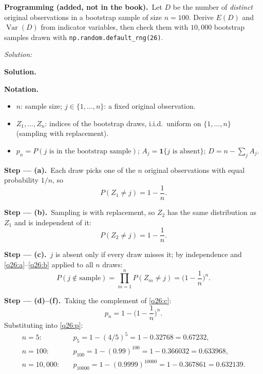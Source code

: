 \documentclass[11pt,a4paper]{article}
\newif\ifsolucoes
\newcommand{\espacoresol}{4.5cm}   %
\numberwithin{equation}{questao}   %
\newcommand{\programacao}{\par\smallskip\noindent\textbf{Programming (added, not in the book).}~}
\newenvironment{notacao}{\par\smallskip\noindent\textbf{Notation.}\begin{itemize}[leftmargin=1.4em,topsep=1pt,itemsep=0pt]\small}{\end{itemize}}
\newcommand{\resolespaco}{\ifsolucoes\else\par\textit{Solution:}\vspace{\espacoresol}\par\fi}
\newcommand{\passo}[2]{\par\smallskip\noindent\textbf{Step --- #1.}~#2}
\newcommand{\solhead}{\par\medskip\noindent{\color{blue!55!black}\rule{\linewidth}{0.3pt}}\par\noindent\textbf{Solution.}}
\newcommand{\Var}{\operatorname{Var}}
\newcommand{\1}{\mathbf{1}}
\begin{document}
\programacao Let $D$ be the number of \emph{distinct} original observations in a bootstrap sample of
size $n=100$. Derive $E(D)$ and $\Var(D)$ from indicator variables, then check them with $10{,}000$
bootstrap samples drawn with \texttt{np.random.default\_rng(26)}.
\resolespaco
\begin{sol}
\solhead
\begin{notacao}
\item $n$: sample size; $j\in\{1,\dots,n\}$: a fixed original observation.
\item $Z_1,\dots,Z_n$: indices of the bootstrap draws, i.i.d.\ uniform on $\{1,\dots,n\}$ (sampling
  with replacement).
\item $p_n=P(j\text{ is in the bootstrap sample})$; $A_j=\1\{j\text{ is absent}\}$; $D=n-\sum_jA_j$.
\end{notacao}

\passo{(a)}{Each draw picks one of the $n$ original observations with equal probability $1/n$, so}
\begin{equation}\label{q26:a}
P(Z_1\neq j)=1-\frac1n .
\end{equation}

\passo{(b)}{Sampling is with replacement, so $Z_2$ has the same distribution as $Z_1$ and is
independent of it:}
\begin{equation}\label{q26:b}
P(Z_2\neq j)=1-\frac1n .
\end{equation}

\passo{(c)}{$j$ is absent only if every draw misses it; by independence and \eqref{q26:a}--\eqref{q26:b}
applied to all $n$ draws:}
\begin{equation}\label{q26:c}
P(j\notin\text{sample})=\prod_{m=1}^nP(Z_m\neq j)=\Big(1-\frac1n\Big)^n .
\end{equation}

\passo{(d)--(f)}{Taking the complement of \eqref{q26:c}:}
\begin{equation}\label{q26:p}
p_n=1-\Big(1-\frac1n\Big)^n .
\end{equation}
Substituting into \eqref{q26:p}:
\begin{align*}
n=5:&\quad p_5=1-(4/5)^5=1-0.32768=0.67232,\\
n=100:&\quad p_{100}=1-(0.99)^{100}=1-0.366032=0.633968,\\
n=10{,}000:&\quad p_{10000}=1-(0.9999)^{10000}=1-0.367861=0.632139.
\end{align*}


\end{sol}
\end{document}
